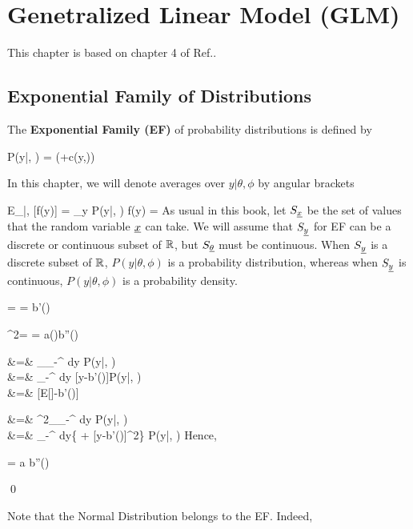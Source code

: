 \chapter{Genetralized Linear Model (GLM)}
\label{ch-gen-lin-mod}

This chapter is based on
chapter 4 of Ref.\cite{agresti-book}.

\section{Exponential Family of Distributions}
\label{sec-exp-fam}

The {\bf Exponential Family (EF)} of probability distributions is defined by

\beq
P(y|\theta, \phi) =
\exp\left(+c(y,\phi)\right)
\eeq

In this chapter, we will
denote averages over $y|\theta, \phi$ by angular brackets

\beq
E_{\rvy|\theta, \phi}[f(y)] = \sum_y P(y|\theta, \phi) f(y) = 
\eeq
As usual in this book, let $S_{\underline{x}}$ be the set of
values that the random variable ${\underline{x}}$ can take.
We will assume that $S_{\underline{y}}$
for EF
can be a discrete or continuous
subset of ${ \mathbb{R}}$,
but $S_{\underline{\theta}}$
must be continuous.
When $S_{\underline{y}}$ is a discrete subset of ${ \mathbb{R}}$, $P(y|\theta, \phi)$
is a probability distribution, whereas when
$S_{\underline{y}}$ is continuous, $P(y|\theta, \phi)$
is a probability density.

\begin{claim}
\beq
\mu = \av{\rvy} = b'(\theta)
\eeq

\beq
\s^2= \av{\rvy, \rvy} = a(\phi)b''(\theta)
\eeq
\end{claim}
\proof

&=& \partial_\theta \int_{-\infty}^\infty
dy\; P(y|\theta, \phi)
\\
&=&
\int_{-\infty}^\infty
dy\;
[y-b'(\theta)]P(y|\theta, \phi)
\\
&=&
[E[\rvy]-b'(\theta)]
\eeqa

&=& \partial^2_\theta \int_{-\infty}^\infty
dy\; P(y|\theta, \phi)
\\
&=&
\int_{-\infty}^\infty
dy\;\left\{ +
[y-b'(\theta)]^2\right\}
P(y|\theta, \phi)
\eeqa
Hence,

\beq
{}= a b''(\theta)
\eeq

\qed

Note that the Normal Distribution
belongs to the EF. Indeed,

